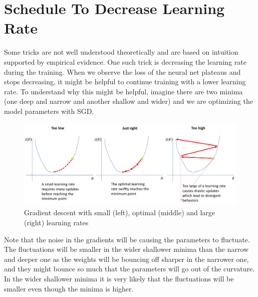 {\centering{}\par}

\section{Schedule To Decrease Learning Rate}
Some tricks are not well understood theoretically and are based on intuition supported by empirical evidence. One such trick is decreasing the learning rate during the training. When we observe the loss of the neural net plateaus and stops decreasing, it might be helpful to continue training with a lower learning rate. To understand why this might be helpful, imagine there are two minima (one deep and narrow and another shallow and wider) and we are optimizing the model parameters with SGD.

\begin{figure}[hbt!]
\centering
\includegraphics[width=115mm]{lectures/02-b/Learning rate_3.png}
\caption{Gradient descent with small (left), optimal (middle) and large (right) learning rates}
\label{fig:learningrate1}
\end{figure}

Note that the noise in the gradients will be causing the parameters to fluctuate. The fluctuations will be smaller in the wider shallower minima than the narrow and deeper one as the weights will be bouncing off sharper in the narrower one, and they might bounce so much that the parameters will go out of the curvature. In the wider shallower minima it is very likely that the fluctuations will be smaller even though the minima is higher.

